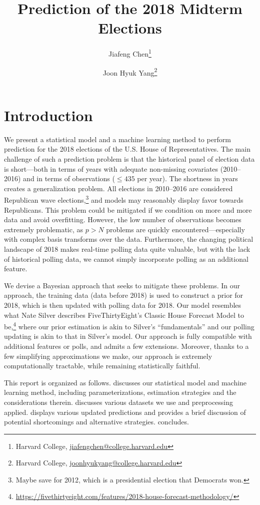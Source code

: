 \documentclass[12pt, letterpaper]{article}
\title{\sffamily\bfseries{Prediction of the 2018 Midterm Elections}}
\author{Jiafeng Chen\thanks{Harvard College, \url{jiafengchen@college.harvard.edu}} \and Joon Hyuk Yang\thanks{Harvard College, \url{joonhyukyang@college.harvard.edu}}}
\begin{document}
\maketitle
\section{Introduction}

We present a statistical model and a machine learning method to perform
prediction for the 2018 elections of the U.S. House of Representatives. The main
challenge of such a prediction problem is that the historical panel of election
data is short---both in terms of years with adequate non-missing covariates
(2010--2016) and in terms of observations ($\le 435$ per year). The shortness in
years creates a generalization problem. All elections in 2010--2016 are
considered Republican wave elections,\footnote{Maybe save for 2012, which is a presidential election that Democrats won.} and models may reasonably display favor
towards Republicans. This problem could be mitigated if we condition on more and
more data and avoid overfitting. However, the low number of observations becomes
extremely problematic, as $p > N$ problems are quickly encountered---especially
with complex basis transforms over the data. Furthermore, the changing political
landscape of 2018 makes real-time polling data quite valuable, but with the lack
of historical polling data, we cannot simply incorporate polling as an
additional feature.

We devise a Bayesian approach that seeks to mitigate these problems. In our
approach, the training data (data before 2018) is used to construct a prior for
2018, which is then updated with polling data for 2018. Our model resembles
what Nate Silver describes FiveThirtyEight's Classic House Forecast Model to
be,\footnote{\url{https://fivethirtyeight.com/features/2018-house-forecast-methodology/}} 
where our prior estimation is akin to Silver's ``fundamentals'' and our
polling updating is akin to that in Silver's model. Our approach is fully
compatible with additional features or polls, and admits a few extensions.
Moreover, thanks to a few simplifying approximations we make, our approach is
extremely computationally tractable, while remaining statistically faithful. 

This report is organized as follows.  discusses our statistical
model and machine learning method, including parameterizations, estimation
strategies and the considerations therein.  discusses various datasets
we use and preprocessing applied.  displays various
updated predictions and provides a brief discussion of potential shortcomings
and alternative strategies.  concludes.
\end{document}

